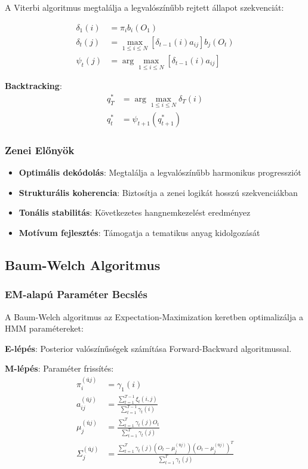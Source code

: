A Viterbi algoritmus megtalálja a legvalószínűbb rejtett állapot szekvenciát:

\begin{align}
\delta_1(i) &= \pi_i b_i(O_1) \\
\delta_t(j) &= \max_{1 \leq i \leq N} [\delta_{t-1}(i) a_{ij}] b_j(O_t) \\
\psi_t(j) &= \arg\max_{1 \leq i \leq N} [\delta_{t-1}(i) a_{ij}]
\end{align}

\textbf{Backtracking}:
\begin{align}
q_T^* &= \arg\max_{1 \leq i \leq N} \delta_T(i) \\
q_t^* &= \psi_{t+1}(q_{t+1}^*)
\end{align}

\subsubsection{Zenei Előnyök}

\begin{itemize}
    \item \textbf{Optimális dekódolás}: Megtalálja a legvalószínűbb harmonikus progressziót
    \item \textbf{Strukturális koherencia}: Biztosítja a zenei logikát hosszú szekvenciákban
    \item \textbf{Tonális stabilitás}: Következetes hangnemkezelést eredményez
    \item \textbf{Motívum fejlesztés}: Támogatja a tematikus anyag kidolgozását
\end{itemize}

\subsection{Baum-Welch Algoritmus}

\subsubsection{EM-alapú Paraméter Becslés}

A Baum-Welch algoritmus az Expectation-Maximization keretben optimalizálja a HMM paramétereket:

\textbf{E-lépés}:
Posterior valószínűségek számítása Forward-Backward algoritmussal.

\textbf{M-lépés}:
Paraméter frissítés:
\begin{align}
\pi_i^{(új)} &= \gamma_1(i) \\
a_{ij}^{(új)} &= \frac{\sum_{t=1}^{T-1} \xi_t(i,j)}{\sum_{t=1}^{T-1} \gamma_t(i)} \\
\mu_j^{(új)} &= \frac{\sum_{t=1}^{T} \gamma_t(j) O_t}{\sum_{t=1}^{T} \gamma_t(j)} \\
\Sigma_j^{(új)} &= \frac{\sum_{t=1}^{T} \gamma_t(j) (O_t - \mu_j^{(új)})(O_t - \mu_j^{(új)})^T}{\sum_{t=1}^{T} \gamma_t(j)}
\end{align}

